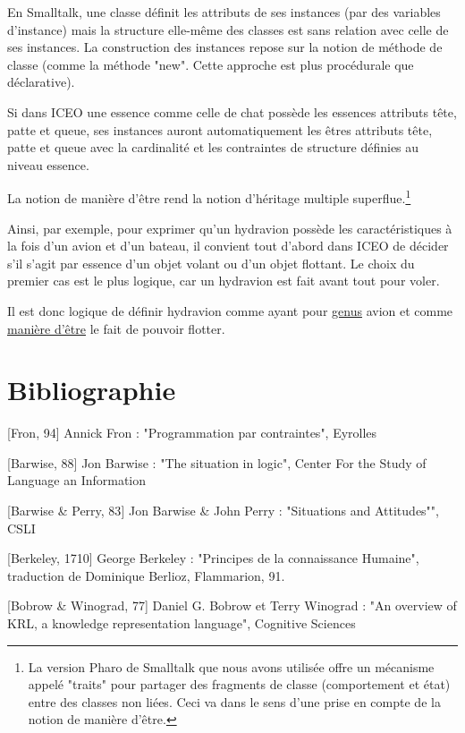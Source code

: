 \documentclass[a4paper, 12pt, openright, french]{book}
\begin{document}
En Smalltalk, une classe définit les attributs de ses instances (par des
variables d'instance) mais la structure elle-même des classes est sans relation
avec celle de ses instances. La construction des instances repose sur la notion de méthode de classe (comme la méthode "new". Cette approche est plus procédurale que déclarative). 

Si dans ICEO une essence comme celle de
chat possède les essences attributs tête, patte et queue, ses instances
auront automatiquement les êtres attributs tête, patte et queue avec la cardinalité et
les contraintes de structure définies au niveau essence.

La notion de manière d'être rend la notion
d'héritage multiple superflue.\footnote{ La version Pharo de Smalltalk que nous avons utilisée offre un mécanisme appelé "traits" pour
	partager des fragments de classe (comportement et état) entre des
	classes non liées. Ceci va dans le sens d'une prise en compte 
	de la notion de manière d'être.}

Ainsi, par exemple, pour exprimer qu'un hydravion
possède les caractéristiques à la fois d'un avion et
d'un bateau, il convient tout d'abord
dans ICEO de décider s'il s'agit par
essence d'un objet volant ou d'un objet
flottant. Le choix du premier cas est le plus logique, car un hydravion
est fait avant tout pour voler.

Il est donc logique de définir hydravion comme ayant pour
\uline{genus} avion et comme \uline{manière
d'être} le fait de pouvoir flotter.




\chapter{Bibliographie}

{[}Fron, 94{]} Annick Fron : "Programmation par contraintes", Eyrolles

{[}Barwise, 88{]} Jon Barwise : "The situation in logic", Center For the
Study of Language an Information

{[}Barwise \& Perry, 83{]} Jon Barwise \& John Perry : "Situations and
Attitudes"", CSLI

{[}Berkeley, 1710{]} George Berkeley : "Principes de la connaissance
Humaine", traduction de Dominique Berlioz, Flammarion, 91.

{[}Bobrow \& Winograd, 77{]} Daniel G. Bobrow et Terry Winograd : "An
overview of KRL, a knowledge representation language", Cognitive
Sciences
\end{document}
